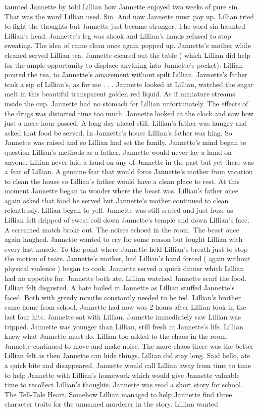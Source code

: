 \documentclass[12pt]{book}
\begin{document}
taunted Jannette by told Lillian how Jannette enjoyed two weeks of pure sin. That was the word Lillian used. Sin. And now Jannette must pay up. Lillian tried to fight the thoughts but Jannette just became stronger. The word sin haunted Lillian's head. Jannette's leg was shook and Lillian's hands refused to stop sweating. The idea of came clean once again popped up. Jannette's mother while cleaned served Lillian tea. Jannette cleared out the table ( which Lillian did help for the ample opportunity to displace anything into Jannette's pocket). Lillian poured the tea, to Jannette's amazement without spilt Lillian. Jannette's father took a sip of Lillian's, as for me . . .  Jannette looked at Lillian, watched the sugar melt in this beautiful transparent golden red liquid. As if miniature streams inside the cup. Jannette had no stomach for Lillian unfortunately. The effects of the drugs was distorted time too much. Jannette looked at the clock and saw how just a mere hour passed. A long day ahead still. Lillian's father was hungry and asked that food be served. In Jannette's house Lillian's father was king. So Jannette was raised and so Lillian had set the family. Jannette's mind began to question Lillian's methods as a father. Jannette would never lay a hand on anyone. Lillian never laid a hand on any of Jannette in the past but yet there was a fear of Lillian. A genuine fear that would force Jannette's mother from vacation to clean the house so Lillian's father would have a clean place to rest. At this moment Jannette began to wonder where the beast was. Lillian's father once again asked that food be served but Jannette's mother continued to clean relentlessly. Lillian began to yell. Jannette was still seated and just froze as Lillian felt dripped of sweat roll down Jannette's temple and down Lillian's face. A screamed match broke out. The noises echoed in the room. The beast once again laughed. Jannette wanted to cry for some reason but fought Lillian with every last muscle. To the point where Jannette held Lillian's breath just to stop the motion of tears. Jannette's mother, had Lillian's hand forced ( again without physical violence ) began to cook. Jannette served a quick dinner which Lillian had no appetite for. Jannette both ate. Lillian watched Jannette scarf the food. Lillian felt disgusted. A hate boiled in Jannette as Lillian stuffed Jannette's faced. Both with greedy mouths constantly needed to be fed. Lillian's brother came home from school. Jannette had now was 2 hours after Lillian took in the last four hits. Jannette sat with Lillian. Jannette immediately saw Lillian was tripped. Jannette was younger than Lillian, still fresh in Jannette's life. Lillian knew what Jannette must do. Lillian too added to the chaos in the room. Jannette continued to move and make noise. The more chaos there was the better Lillian felt as then Jannette can hide things. Lillian did stay long. Said hello, ate a quick bite and disappeared. Jannette would call Lillian away from time to time to help Jannette with Lillian's homework which would give Jannette valuable time to recollect Lillian's thoughts. Jannette was read a short story for school. The Tell-Tale Heart. Somehow Lillian managed to help Jannette find three character traits for the unnamed murderer in the story. Lillian wanted 
\end{document}
